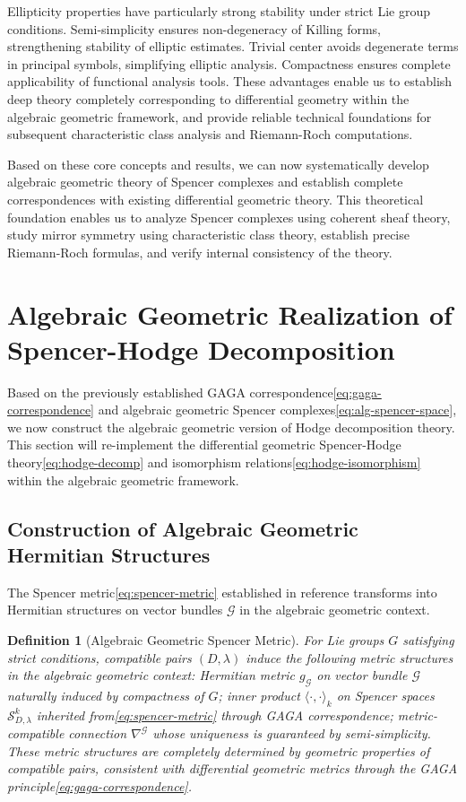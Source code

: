 \documentclass[a4paper,12pt]{extarticle}
\newtheorem{definition}{Definition}
\theoremstyle{definition}
\begin{document}
Ellipticity properties have particularly strong stability under strict Lie group conditions. Semi-simplicity ensures non-degeneracy of Killing forms, strengthening stability of elliptic estimates. Trivial center avoids degenerate terms in principal symbols, simplifying elliptic analysis. Compactness ensures complete applicability of functional analysis tools. These advantages enable us to establish deep theory completely corresponding to differential geometry within the algebraic geometric framework, and provide reliable technical foundations for subsequent characteristic class analysis and Riemann-Roch computations.

Based on these core concepts and results, we can now systematically develop algebraic geometric theory of Spencer complexes and establish complete correspondences with existing differential geometric theory. This theoretical foundation enables us to analyze Spencer complexes using coherent sheaf theory, study mirror symmetry using characteristic class theory, establish precise Riemann-Roch formulas, and verify internal consistency of the theory.

\section{Algebraic Geometric Realization of Spencer-Hodge Decomposition}

Based on the previously established GAGA correspondence\eqref{eq:gaga-correspondence} and algebraic geometric Spencer complexes\eqref{eq:alg-spencer-space}, we now construct the algebraic geometric version of Hodge decomposition theory. This section will re-implement the differential geometric Spencer-Hodge theory\eqref{eq:hodge-decomp} and isomorphism relations\eqref{eq:hodge-isomorphism} within the algebraic geometric framework.

\subsection{Construction of Algebraic Geometric Hermitian Structures}

The Spencer metric\eqref{eq:spencer-metric} established in reference\cite{zheng2025geometric} transforms into Hermitian structures on vector bundles $\mathcal{G}$ in the algebraic geometric context.

\begin{definition}[Algebraic Geometric Spencer Metric]
For Lie groups $G$ satisfying strict conditions, compatible pairs $(D,\lambda)$ induce the following metric structures in the algebraic geometric context: Hermitian metric $g_{\mathcal{G}}$ on vector bundle $\mathcal{G}$ naturally induced by compactness of $G$; inner product $\langle \cdot, \cdot \rangle_k$ on Spencer spaces $\mathcal{S}^k_{D,\lambda}$ inherited from\eqref{eq:spencer-metric} through GAGA correspondence; metric-compatible connection $\nabla^{\mathcal{G}}$ whose uniqueness is guaranteed by semi-simplicity. These metric structures are completely determined by geometric properties of compatible pairs, consistent with differential geometric metrics through the GAGA principle\eqref{eq:gaga-correspondence}.
\end{definition}
\end{document}

